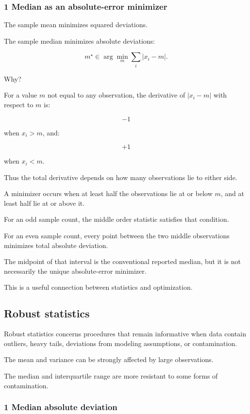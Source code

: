\subsubsection{1 Median as an absolute-error minimizer}\label{02-foundations-ii-ch030-median-as-an-absolute-error-minimizer}

The sample mean minimizes squared deviations.

The sample median minimizes absolute deviations:

\[
 \boxed{ m^\star\in \arg\min_m\sum_i|x_i-m| }.
\]

Why?

For a value \(m\) not equal to any observation, the derivative of \(|x_i-m|\) with respect to \(m\) is:

\[
 -1
\]

when \(x_i>m\), and:

\[
 +1
\]

when \(x_i<m\).

Thus the total derivative depends on how many observations lie to either side.

A minimizer occurs when at least half the observations lie at or below \(m\), and at least half lie at or above it.

For an odd sample count, the middle order statistic satisfies that condition.

For an even sample count, every point between the two middle observations minimizes total absolute deviation.

The midpoint of that interval is the conventional reported median, but it is not necessarily the unique absolute-error minimizer.

This is a useful connection between statistics and optimization.

\subsection{Robust statistics}\label{02-foundations-ii-ch030-robust-statistics}

Robust statistics concerns procedures that remain informative when data contain outliers, heavy tails, deviations from modeling assumptions, or contamination.

The mean and variance can be strongly affected by large observations.

The median and interquartile range are more resistant to some forms of contamination.

\subsubsection{1 Median absolute deviation}\label{02-foundations-ii-ch030-median-absolute-deviation}

